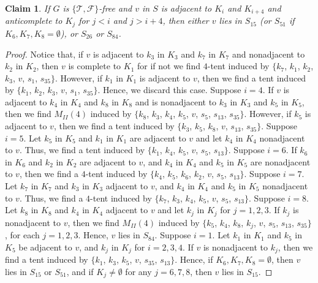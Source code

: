 \documentclass[12pt]{book}
\theoremstyle{plain}
\newtheorem{claim}[teo]{Claim}
\theoremstyle{remark}
\begin{document}
\begin{claim} \label{claim:co4tent_5} %
	If $G$ is $\{ \mathcal{T}, \mathcal{F} \}$-free and $v$ in $S$ is adjacent to $K_i$ and $K_{i+4}$ and anticomplete to $K_j$ for $j<i$ and $j>i+4$, then either $v$ lies in $S_{15}$ (or $S_{51}$ if $K_6, K_7, K_8 = \emptyset$), or $S_{26}$ or $S_{84}$.
\end{claim}
\begin{proof}
	Notice that, if $v$ is adjacent to $k_3$ in $K_3$ and $k_7$ in $K_7$ and nonadjacent to $k_2$ in $K_2$, then $v$ is complete to $K_1$ for if not we find $4$-tent induced by $\{k_7$, $k_1$, $k_2$, $k_3$, $v$, $s_1$, $s_{35} \}$. However, if $k_1$ in $K_1$ is adjacent to $v$, then we find a tent induced by $\{ k_1$, $k_2$, $k_3$, $v$, $s_1$, $s_{35} \}$. Hence, we discard this case.
	Suppose $i=4$. If $v$ is adjacent to $k_4$ in $K_4$ and $k_8$ in $K_8$ and is nonadjacent to $k_3$ in $K_3$ and $k_5$ in $K_5$, then we find $M_{II}(4)$ induced by $\{k_8$, $k_3$, $k_4$, $k_5$, $v$, $s_5$, $s_{13}$, $s_{35} \}$. However, if $k_5$ is adjacent to $v$, then we find a tent induced by $\{ k_3$, $k_5$, $k_8$, $v$, $s_{13}$, $s_{35} \}$. %
	Suppose $i=5$. Let $k_5$ in $K_5$ and $k_1$ in $K_1$ are adjacent to $v$ and let $k_4$ in $K_4$ nonadjacent to $v$. Thus, we find a tent induced by $\{ k_1$, $k_4$, $k_5$, $v$, $s_5$, $s_{13} \}$. %
	Suppose $i=6$. If $k_6$ in $K_6$ and $k_2$ in $K_2$ are adjacent to $v$, and $k_4$ in $K_4$ and $k_5$ in $K_5$ are nonadjacent to $v$, then we find a $4$-tent induced by $\{ k_4$, $k_5$, $k_6$, $k_2$, $v$, $s_5$, $s_{13} \}$. %
	Suppose $i=7$. Let $k_7$ in $K_7$ and $k_3$ in $K_3$ adjacent to $v$, and $k_4$ in $K_4$ and $k_5$ in $K_5$ nonadjacent to $v$. Thus, we find a $4$-tent induced by $\{ k_7$, $k_3$, $k_4$, $k_5$, $v$, $s_5$, $s_{13} \}$. %
	Suppose $i=8$. Let $k_8$ in $K_8$ and $k_4$ in $K_4$ adjacent to $v$ and let $k_j$ in $K_j$ for $j=1,2,3$. If $k_j$ is nonadjacent to $v$, then we find $M_{II}(4)$ induced by $\{ k_5$, $k_4$, $k_8$, $k_j$,  $v$, $s_5$, $s_{13}$, $s_{35} \}$, for each $j=1, 2, 3$. Hence, $v$ lies in $S_{84}$.
	Suppose $i=1$. Let $k_1$ in $K_1$ and $k_5$ in $K_5$ be adjacent to $v$, and $k_j$ in $K_j$ for $i=2,3,4$. If $v$ is nonadjacent to $k_j$, then we find a tent induced by $\{ k_1$, $k_3$, $k_5$, $v$, $s_{35}$, $s_{13} \}$. Hence, if $K_6, K_7, K_8 = \emptyset$, then $v$ lies in $S_{15}$ or $S_{51}$, and if $K_j \neq \emptyset$ for any $j=6,7,8$, then $v$ lies in $S_{15}$.

\end{proof}
\end{document}

